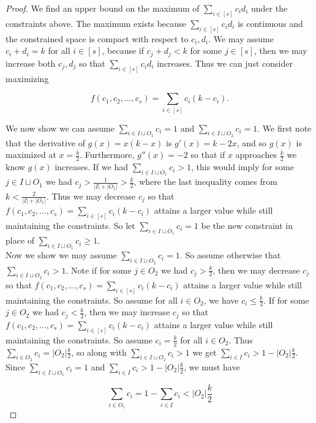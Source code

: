 \documentclass{article}
\begin{document}
\begin{proof}
We find an upper bound on the maximum of $\sum_{i \in [s]} c_id_i$ under the constraints above. The maximum exists because $\sum_{i \in [s]} c_id_i$ is continuous and the constrained space is compact with respect to $c_i,d_i$. We may assume $c_i + d_i = k$ for all $i \in [s]$, because if $c_j + d_j < k$ for some $j \in [s]$, then we may increase both $c_j,d_j$ so that $\sum_{i \in [s]} c_id_i$ increases. Thus we can just consider maximizing  

$$f(c_1,c_2,\ldots,c_{s}) = \sum_{i \in [s]} c_i(k-c_i).$$

We now show we can assume $\sum_{i \in I \sqcup O_1} c_i  = 1$ and $\sum_{i \in I \sqcup O_2} c_i  = 1$. We first note that the derivative of $g(x) = x(k-x)$ is $g'(x) = k-2x$, and so $g(x)$ is maximized at $x = \frac{k}{2}$. Furthermore, $g''(x) = -2$ so that if $x$ approaches $\frac{k}{2}$ we know $g(x)$ increases. If we had $\sum_{i \in I \sqcup O_1} c_i  > 1$, this would imply for some $j \in I \sqcup O_1$ we had $c_j > \frac{1}{|I| + |O_1|} > \frac{k}{2}$, where the last inequality comes from $k < \frac{2}{|I| + |O_1|}$. Thus we may decrease $c_j$ so that $f(c_1,c_2,\ldots,c_{s}) = \sum_{i \in [s]} c_i(k-c_i)$ attains a larger value while still maintaining the constraints. So let $\sum_{i \in I \sqcup O_1} c_i  = 1$ be the new constraint in place of $\sum_{i \in I \sqcup O_1} c_i  \geq 1$. \\

Now we show we may assume $\sum_{i \in I \sqcup O_2} c_i = 1$. So assume otherwise that $\sum_{i \in I \sqcup O_2} c_i > 1$. Note if for some $j \in O_2$ we had $c_j > \frac{k}{2}$, then we may decrease $c_j$ so that $f(c_1,c_2,\ldots,c_{s}) = \sum_{i \in [s]} c_i(k-c_i)$ attains a larger value while still maintaining the constraints. So assume for all $i \in O_2$, we have $c_i \leq \frac{k}{2}$. If for some $j \in O_2$ we had $c_j < \frac{k}{2}$, then we may increase $c_j$ so that $f(c_1,c_2,\ldots,c_{s}) = \sum_{i \in [s]} c_i(k-c_i)$ attains a larger value while still maintaining the constraints. So assume $c_i = \frac{k}{2}$ for all $i \in O_2$. Thus $\sum_{i \in O_2} c_i = |O_2|\frac{k}{2}$, so along with $\sum_{i \in I \sqcup O_2} c_i > 1$ we get $\sum_{i \in I} c_i > 1 - | O_2|\frac{k}{2}$. \\

Since $\sum_{i \in I \sqcup O_1} c_i = 1$ and $\sum_{i \in I} c_i > 1 - | O_2|\frac{k}{2}$, we must have 

$$\sum_{i \in O_1} c_i = 1-\sum_{i \in I} c_i < | O_2|\frac{k}{2}$$


\end{proof}
\end{document}
